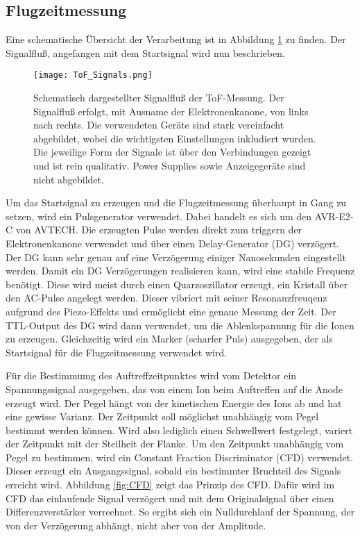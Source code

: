 \subsection{Flugzeitmessung}
Eine schematische Übersicht der Verarbeitung ist in Abbildung \ref{fig:ToF} zu finden. Der Signalfluß, angefangen mit dem Startsignal wird nun beschrieben.
\begin{figure} 
    \centering
    \texttt{[image: ToF\_Signals.png]}
    \caption[Schematisch dargestellter Signalfluß der ToF-Messung]{Schematisch dargestellter Signalfluß der ToF-Messung. Der Signalfluß erfolgt, mit Ausname der Elektronenkanone, von links nach rechts. Die verwendeten Geräte sind stark vereinfacht abgebildet, wobei die wichtigsten Einstellungen inkludiert wurden. Die jeweilige Form der Signale ist über den Verbindungen gezeigt und ist rein qualitativ. Power Supplies sowie Anzeigegeräte sind nicht abgebildet.}
    \label{fig:ToF} 
\end{figure}
Um das Startsignal zu erzeugen und die Flugzeitmessung überhaupt in Gang zu setzen, wird ein Pulsgenerator verwendet. Dabei handelt es sich um den AVR-E2-C von AVTECH. Die erzeugten Pulse werden direkt zum triggern der Elektronenkanone verwendet und über einen Delay-Generator (DG) verzögert. Der DG kann sehr genau auf eine Verzögerung einiger Nanosekunden eingestellt werden. Damit ein DG Verzögerungen realisieren kann, wird eine stabile Frequenz benötigt. Diese wird meist durch einen Quarzoszillator erzeugt, ein Kristall über den AC-Pulse angelegt werden. Dieser vibriert mit seiner Resonanzfreuqenz aufgrund des Piezo-Effekts und ermöglicht eine genaue Messung der Zeit. Der TTL-Output des DG wird dann verwendet, um die Ablenkspannung für die Ionen zu erzeugen. Gleichzeitig wird ein Marker (scharfer Puls) ausgegeben, der als Startsignal für die Flugzeitmessung verwendet wird.

Für die Bestimmumg des Auftreffzeitpunktes wird vom Detektor ein Spannungssignal ausgegeben, das von einem Ion beim Auftreffen auf die Anode erzeugt wird.  Der Pegel hängt von der kinetischen Energie des Ions ab und hat eine gewisse Varianz. Der Zeitpunkt soll möglichst unabhängig vom Pegel bestimmt werden können. Wird also lediglich einen Schwellwert festgelegt, variert der Zeitpunkt mit der Steilheit der Flanke. Um den Zeitpunkt unabhängig vom Pegel zu bestimmen, wird ein Constant Fraction Discriminator (CFD) verwendet. Dieser erzeugt ein Ausgangssignal, sobald ein bestimmter Bruchteil des Signals erreicht wird. Abbildung \ref{fig:CFD} zeigt das Prinzip des CFD. Dafür wird im CFD das einlaufende Signal verzögert und mit dem Originalsignal über einen Differenzverstärker verrechnet. So ergibt sich ein Nulldurchlauf der Spannung, der von der Verzögerung abhängt, nicht aber von der Amplitude. 

